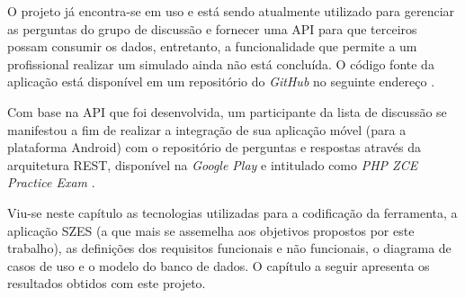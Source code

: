 O projeto já encontra-se em uso e está sendo atualmente utilizado para 
gerenciar as perguntas do grupo de discussão e fornecer uma \ac{API} para que 
terceiros possam consumir os dados, entretanto, a funcionalidade que permite a
um profissional realizar um simulado ainda não está concluída. O código fonte da
aplicação está disponível em um repositório do \textit{GitHub} no seguinte
endereço \cite{githubZCPE}.

Com base na \acs{API} que foi desenvolvida, um participante da lista de
discussão se manifestou a fim de realizar a integração de sua aplicação móvel (para a
plataforma Android) com o repositório de perguntas e respostas através da arquitetura
\ac{REST}, disponível na \textit{Google Play} e intitulado como \textit{PHP ZCE
Practice Exam} \cite{googlePlayPHPZCEPracticeExam}.





Viu-se neste capítulo as tecnologias utilizadas para a codificação da
ferramenta, a aplicação SZES (a que mais se assemelha aos objetivos propostos
por este trabalho), as definições dos requisitos funcionais e não funcionais, o
diagrama de casos de uso e o modelo do banco de dados. O capítulo a seguir 
apresenta os resultados obtidos com este projeto.
